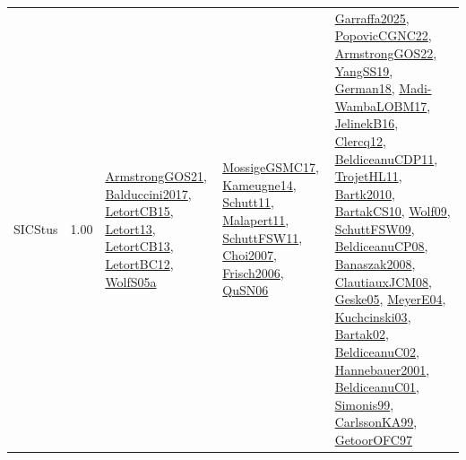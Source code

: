 {\begin{longtable}{p{3cm}r>{\raggedright\arraybackslash}p{6cm}>{\raggedright\arraybackslash}p{6cm}>{\raggedright\arraybackslash}p{8cm}}
\index{SICStus}\index{CPSystems!SICStus}SICStus &  1.00 & \hyperref[detail:ArmstrongGOS21]{ArmstrongGOS21}, \hyperref[detail:Balduccini2017]{Balduccini2017}, \hyperref[detail:LetortCB15]{LetortCB15}, \hyperref[detail:Letort13]{Letort13}, \hyperref[detail:LetortCB13]{LetortCB13}, \hyperref[detail:LetortBC12]{LetortBC12}, \hyperref[detail:WolfS05a]{WolfS05a} & \hyperref[detail:MossigeGSMC17]{MossigeGSMC17}, \hyperref[detail:Kameugne14]{Kameugne14}, \hyperref[detail:Schutt11]{Schutt11}, \hyperref[detail:Malapert11]{Malapert11}, \hyperref[detail:SchuttFSW11]{SchuttFSW11}, \hyperref[detail:Choi2007]{Choi2007}, \hyperref[detail:Frisch2006]{Frisch2006}, \hyperref[detail:QuSN06]{QuSN06} & \hyperref[detail:Garraffa2025]{Garraffa2025}, \hyperref[detail:PopovicCGNC22]{PopovicCGNC22}, \hyperref[detail:ArmstrongGOS22]{ArmstrongGOS22}, \hyperref[detail:YangSS19]{YangSS19}, \hyperref[detail:German18]{German18}, \hyperref[detail:Madi-WambaLOBM17]{Madi-WambaLOBM17}, \hyperref[detail:JelinekB16]{JelinekB16}, \hyperref[detail:Clercq12]{Clercq12}, \hyperref[detail:BeldiceanuCDP11]{BeldiceanuCDP11}, \hyperref[detail:TrojetHL11]{TrojetHL11}, \hyperref[detail:Bartk2010]{Bartk2010}, \hyperref[detail:BartakCS10]{BartakCS10}, \hyperref[detail:Wolf09]{Wolf09}, \hyperref[detail:SchuttFSW09]{SchuttFSW09}, \hyperref[detail:BeldiceanuCP08]{BeldiceanuCP08}, \hyperref[detail:Banaszak2008]{Banaszak2008}, \hyperref[detail:ClautiauxJCM08]{ClautiauxJCM08}, \hyperref[detail:Geske05]{Geske05}, \hyperref[detail:MeyerE04]{MeyerE04}, \hyperref[detail:Kuchcinski03]{Kuchcinski03}, \hyperref[detail:Bartak02]{Bartak02}, \hyperref[detail:BeldiceanuC02]{BeldiceanuC02}, \hyperref[detail:Hannebauer2001]{Hannebauer2001}, \hyperref[detail:BeldiceanuC01]{BeldiceanuC01}, \hyperref[detail:Simonis99]{Simonis99}, \hyperref[detail:CarlssonKA99]{CarlssonKA99}, \hyperref[detail:GetoorOFC97]{GetoorOFC97}\\

\end{longtable}}
